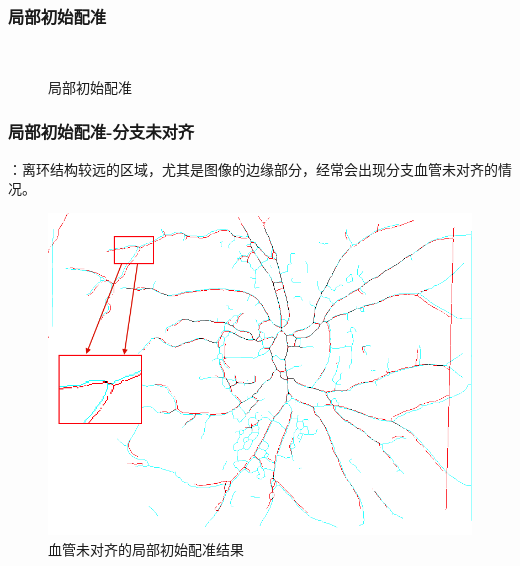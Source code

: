 \documentclass[notheorems,mathserif,table,compress]{beamer}  %
\begin{document}
 \begin{frame}
 \frametitle{局部初始配准}
 \begin{figure}[ht!]
 \setcounter{subfigure}{0}
\hspace{0.1in}
  \\
\hspace{0.1in}
  \caption{局部初始配准}
 \end{figure}
\end{frame}


 \begin{frame}
 \frametitle{局部初始配准-分支未对齐}
  {\color{red}{当前存在问题}}：离环结构较远的区域，尤其是图像的边缘部分，经常会出现分支血管未对齐的情况。
     \begin{figure}[ht!]
    \centering
  \includegraphics[width=0.6\linewidth]{067-119-initial_reg.png}
  \caption{血管未对齐的局部初始配准结果}
 \end{figure}
\end{frame}
\end{document}
